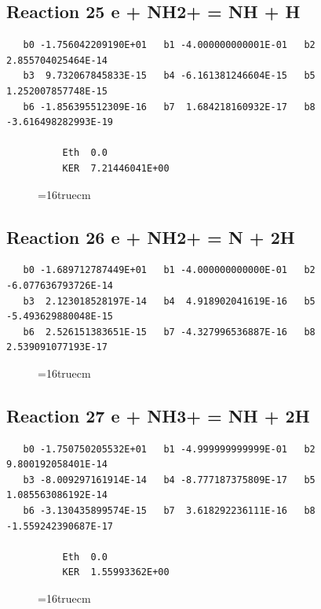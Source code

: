 \documentclass[12pt,dvipdfm]{article}
\begin{document}
\subsection{
Reaction 25 e + NH2+ = NH + H }
\begin{small}\begin{verbatim}
   b0 -1.756042209190E+01   b1 -4.000000000001E-01   b2  2.855704025464E-14
   b3  9.732067845833E-15   b4 -6.161381246604E-15   b5  1.252007857748E-15
   b6 -1.856395512309E-16   b7  1.684218160932E-17   b8 -3.616498282993E-19

          Eth  0.0
          KER  7.21446041E+00

\end{verbatim}\end{small}
\begin{figure}[h!] \label{n2rates}
\epsfxsize=16truecm
\end{figure}
\newpage

\subsection{
Reaction 26 e + NH2+ = N + 2H }
\begin{small}\begin{verbatim}
   b0 -1.689712787449E+01   b1 -4.000000000000E-01   b2 -6.077636793726E-14
   b3  2.123018528197E-14   b4  4.918902041619E-16   b5 -5.493629880048E-15
   b6  2.526151383651E-15   b7 -4.327996536887E-16   b8  2.539091077193E-17
\end{verbatim}\end{small}
\begin{figure}[h!] \label{n2rates}
\epsfxsize=16truecm
\end{figure}
\newpage

\subsection{
Reaction 27 e + NH3+ = NH + 2H }
\begin{small}\begin{verbatim}
   b0 -1.750750205532E+01   b1 -4.999999999999E-01   b2  9.800192058401E-14
   b3 -8.009297161914E-14   b4 -8.777187375809E-17   b5  1.085563086192E-14
   b6 -3.130435899574E-15   b7  3.618292236111E-16   b8 -1.559242390687E-17

          Eth  0.0
          KER  1.55993362E+00

\end{verbatim}\end{small}
\begin{figure}[h!] \label{n2rates}
\epsfxsize=16truecm
\end{figure}
\newpage
\end{document}

